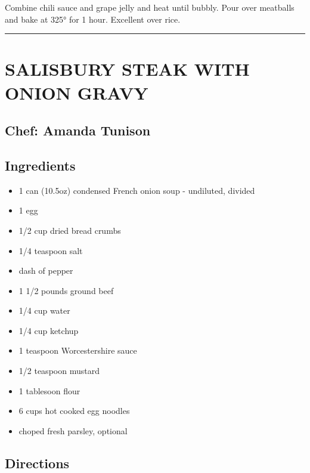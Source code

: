 \documentclass[
]{book}
\providecommand{\tightlist}{%
  \setlength{\itemsep}{0pt}\setlength{\parskip}{0pt}}
\begin{document}
Combine chili sauce and grape jelly and heat until bubbly. Pour over meatballs and bake at 325° for 1 hour. Excellent over rice.

\begin{center}\rule{0.5\linewidth}{0.5pt}\end{center}

\hypertarget{salisbury-steak-with-onion-gravy}{%
\section*{SALISBURY STEAK WITH ONION GRAVY}\label{salisbury-steak-with-onion-gravy}}


\hypertarget{chef-amanda-tunison-1}{%
\subsection*{Chef: Amanda Tunison}\label{chef-amanda-tunison-1}}


\hypertarget{ingredients-63}{%
\subsection*{Ingredients}\label{ingredients-63}}


\begin{itemize}
\tightlist
\item
  1 can (10.5oz) condensed French onion soup - undiluted, divided
\item
  1 egg
\item
  1/2 cup dried bread crumbs
\item
  1/4 teaspoon salt
\item
  dash of pepper
\item
  1 1/2 pounds ground beef
\item
  1/4 cup water
\item
  1/4 cup ketchup
\item
  1 teaspoon Worcestershire sauce
\item
  1/2 teaspoon mustard
\item
  1 tablesoon flour
\item
  6 cups hot cooked egg noodles
\item
  choped fresh parsley, optional
\end{itemize}

\hypertarget{directions-63}{%
\subsection*{Directions}\label{directions-63}}
\end{document}
